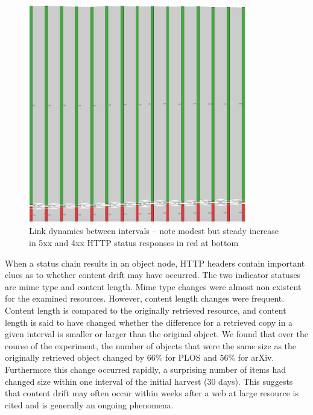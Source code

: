 \documentclass[12pt]{article}
\begin{document}
\begin{figure}[ht!]
  \includegraphics[width=0.85\textwidth]{figure8.png}
  \caption{Link dynamics between intervals – note modest but steady increase in 5xx and 4xx HTTP status responses in red at bottom}
  \label{fig:linkdynam}
\end{figure}
When a status chain results in an object node, HTTP headers contain important clues as to whether content drift may have occurred. The two indicator  statuses are mime type and content length. Mime type changes were almost non existent for the examined resources. However, content length changes were frequent. Content length is compared to the originally retrieved resource, and content length is said to have changed whether the difference for a retrieved copy in a given interval is smaller or larger than the original object. We found that over the course of the experiment, the number of objects that were the same size as the originally retrieved object changed by 66\%  for PLOS and 56\% for arXiv. Furthermore this change occurred rapidly, a surprising number of items had changed size within one interval of the initial harvest (30 days). This suggests that content drift may often occur within weeks after a web at large resource is cited and is generally an ongoing phenomena.
\end{document}
